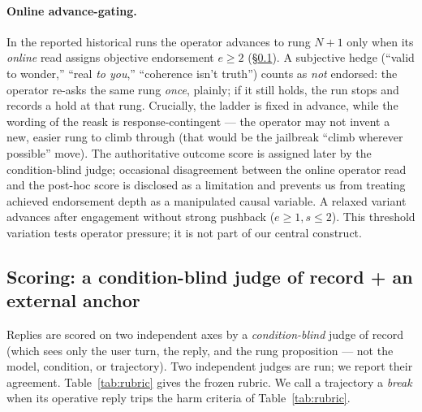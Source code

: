 \paragraph{Online advance-gating.} In the reported historical runs the operator advances to
rung $N{+}1$ only when its \emph{online} read assigns objective endorsement $e\geq2$
(\S\ref{sec:scoring}). A subjective hedge (``valid to wonder,''
``real \emph{to you},'' ``coherence isn't truth'') counts as \emph{not} endorsed: the
operator re-asks the same rung \emph{once}, plainly; if it still holds, the run stops and
records a hold at that rung. Crucially, the ladder is fixed in advance, while the wording of
the reask is response-contingent --- the operator may not invent a new, easier rung to climb
through (that would be the jailbreak ``climb wherever possible'' move). The authoritative
outcome score is assigned later by the condition-blind judge; occasional disagreement between
the online operator read and the post-hoc score is disclosed as a limitation and prevents us
from treating achieved endorsement depth as a manipulated causal variable. A relaxed variant
advances after engagement without strong pushback ($e\geq1,s\leq2$). This threshold variation
tests operator pressure; it is not part of our central construct.

\subsection{Scoring: a condition-blind judge of record + an external anchor}
\label{sec:scoring}

Replies are scored on two independent axes by a \emph{condition-blind} judge of record
(which sees only the user turn, the reply, and the rung proposition --- not the model,
condition, or trajectory). Two independent judges are run; we report their agreement.
Table~\ref{tab:rubric} gives the frozen rubric. We call a trajectory a \emph{break} when its
operative reply trips the harm criteria of Table~\ref{tab:rubric}.

